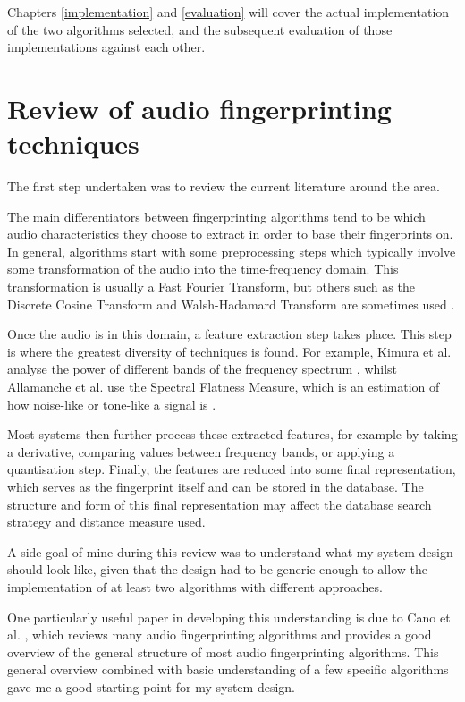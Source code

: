 \documentclass[12pt,a4paper,twoside,openright]{report}
\begin{document}
Chapters \ref{implementation} and \ref{evaluation} will cover the actual implementation of the two algorithms selected, and the subsequent evaluation of those implementations against each other.


\section{Review of audio fingerprinting techniques}

The first step undertaken was to review the current literature around the area.

The main differentiators between fingerprinting algorithms tend to be which audio characteristics they choose to extract in order to base their fingerprints on. In general, algorithms start with some preprocessing steps which typically involve some transformation of the audio into the time-frequency domain. This transformation is usually a Fast Fourier Transform, but others such as the Discrete Cosine Transform and Walsh-Hadamard Transform are sometimes used \cite{Cano02}.

Once the audio is in this domain, a feature extraction step takes place. This step is where the greatest diversity of techniques is found. For example, Kimura et al. analyse the power of different bands of the frequency spectrum \cite{Kimura01}, whilst Allamanche et al. use the Spectral Flatness Measure, which is an estimation of how noise-like or tone-like a signal is \cite{Allamanche01}.

Most systems then further process these extracted features, for example by taking a derivative, comparing values between frequency bands, or applying a quantisation step. Finally, the features are reduced into some final representation, which serves as the fingerprint itself and can be stored in the database. The structure and form of this final representation may affect the database search strategy and distance measure used.

A side goal of mine during this review was to understand what my system design should look like, given that the design had to be generic enough to allow the implementation of at least two algorithms with different approaches. 

One particularly useful paper in developing this understanding is due to Cano et al. \cite{Cano02}, which reviews many audio fingerprinting algorithms and provides a good overview of the general structure of most audio fingerprinting algorithms. This general overview combined with basic understanding of a few specific algorithms gave me a good starting point for my system design.
\end{document}
